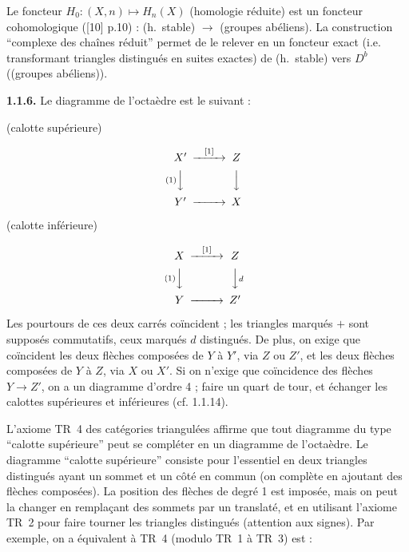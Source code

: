 \documentclass[12pt,a4paper]{article}
\theoremstyle{plain}
\theoremstyle{definition}
\theoremstyle{remark}
\begin{document}
Le foncteur $H_{0} : (X, n) \longmapsto H_{n}(X)$ (homologie réduite) est un foncteur cohomologique ([10] p.10) : (h.~stable) $\to$ (groupes abéliens). La construction ``complexe des chaînes réduit'' permet de le relever en un foncteur exact (i.e. transformant triangles distingués en suites exactes) de (h.~stable) vers $D^{b}$((groupes abéliens)).

\medskip

\noindent
\textbf{1.1.6.} Le diagramme de l'octaèdre est le suivant :

\begin{center}
\begin{minipage}{0.45\textwidth}
\centering
(calotte supérieure)

\vspace{0.3cm}
\[
\begin{CD}
X' @>{[1]}>> Z \\
@V{(1)}VV @VVV \\
Y' @>>> X
\end{CD}
\]
\end{minipage}
\hfill
\begin{minipage}{0.45\textwidth}
\centering
(calotte inférieure)

\vspace{0.3cm}
\[
\begin{CD}
X @>{[1]}>> Z \\
@V{(1)}VV @VVdV \\
Y @>>> Z'
\end{CD}
\]
\end{minipage}
\end{center}

Les pourtours de ces deux carrés coïncident ; les triangles marqués $+$ sont supposés commutatifs, ceux marqués $d$ distingués. De plus, on exige que coïncident les deux flèches composées de $Y$ à $Y'$, via $Z$ ou $Z'$, et les deux flèches composées de $Y$ à $Z$, via $X$ ou $X'$. Si on n'exige que coïncidence des flèches $Y \to Z'$, on a un diagramme d'ordre 4 ; faire un quart de tour, et échanger les calottes supérieures et inférieures (cf. 1.1.14).

L'axiome TR~4 des catégories triangulées affirme que tout diagramme du type ``calotte supérieure'' peut se compléter en un diagramme de l'octaèdre. Le diagramme ``calotte supérieure'' consiste pour l'essentiel en deux triangles distingués ayant un sommet et un côté en commun (on complète en ajoutant des flèches composées). La position des flèches de degré 1 est imposée, mais on peut la changer en remplaçant des sommets par un translaté, et en utilisant l'axiome TR~2 pour faire tourner les triangles distingués (attention aux signes). Par exemple, on a équivalent à TR~4 (modulo TR~1 à TR~3) est :
\end{document}
